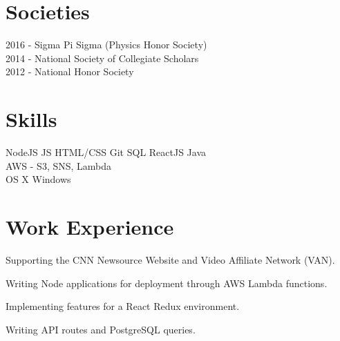 \documentclass[]{deedy-resume-openfont}
\begin{document}
\begin{minipage}[t]{0.33\textwidth}

\section{Societies} 
2016 - Sigma Pi Sigma (Physics Honor Society)\\
2014 - National Society of Collegiate Scholars\\
2012 - National Honor Society\\
\sectionsep

%
%

\end{minipage} 
\hfill
\begin{minipage}[t]{0.66\textwidth}


\section{Skills}
NodeJS \textbullet{} JS \textbullet{} HTML/CSS \textbullet{} Git \textbullet{} SQL \textbullet{} ReactJS \textbullet{} Java \\
AWS - S3, SNS, Lambda\\
OS X \textbullet{} Windows \\
\sectionsep


\section{Work Experience}
\vspace{\topsep} %
\begin{tightemize}
\item Supporting the CNN Newsource Website and Video Affiliate Network (VAN).
\item Writing Node applications for deployment through AWS Lambda functions.
\item Implementing features for a React Redux environment.
\item Writing API routes and PostgreSQL queries.
\end{tightemize}
\sectionsep


\end{minipage}
\end{document}
